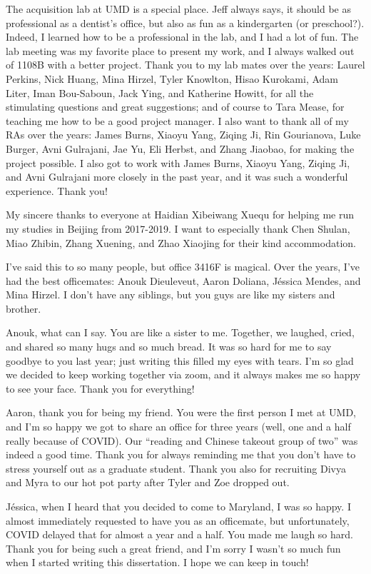 The acquisition lab at UMD is a special place. Jeff always says, it should be as professional as a dentist's office, but also as fun as a kindergarten (or preschool?). Indeed, I learned how to be a professional in the lab, and I had a lot of fun. The lab meeting was my favorite place to present my work, and I always walked out of 1108B with a better project. Thank you to my lab mates over the years: Laurel Perkins, Nick Huang, Mina Hirzel, Tyler Knowlton, Hisao Kurokami, Adam Liter, Iman Bou-Saboun, Jack Ying, and Katherine Howitt, for all the stimulating questions and great suggestions; and of course to Tara Mease, for teaching me how to be a good project manager. I also want to thank all of my RAs over the years: James Burns, Xiaoyu Yang, Ziqing Ji, Rin Gourianova, Luke Burger, Avni Gulrajani, Jae Yu, Eli Herbst, and Zhang Jiaobao, for making the project possible. I also got to work with James Burns, Xiaoyu Yang, Ziqing Ji, and Avni Gulrajani more closely in the past year, and it was such a wonderful experience. Thank you!
 
My sincere thanks to everyone at Haidian Xibeiwang Xuequ for helping me run my studies in Beijing from 2017-2019.  I want to especially thank Chen Shulan, Miao Zhibin, Zhang Xuening, and Zhao Xiaojing for their kind accommodation.
 
I’ve said this to so many people, but office 3416F is magical. Over the years, I’ve had the best officemates: Anouk Dieuleveut, Aaron Doliana, J\'essica Mendes, and Mina Hirzel. I don’t have any siblings, but you guys are like my sisters and brother.
 
Anouk, what can I say. You are like a sister to me. Together, we laughed, cried, and shared so many hugs and so much bread. It was so hard for me to say goodbye to you last year; just writing this filled my eyes with tears. I’m so glad we decided to keep working together via zoom, and it always makes me so happy to see your face. Thank you for everything!
 
Aaron, thank you for being my friend. You were the first person I met at UMD, and I’m so happy we got to share an office for three years (well, one and a half really because of COVID). Our “reading and Chinese takeout group of two” was indeed a good time. Thank you for always reminding me that you don’t have to stress yourself out as a graduate student. Thank you also for recruiting Divya and Myra to our hot pot party after Tyler and Zoe dropped out.

 
J\'essica, when I heard that you decided to come to Maryland, I was so happy. I almost immediately requested to have you as an officemate, but unfortunately, COVID delayed that for almost a year and a half. You made me laugh so hard. Thank you for being such a great friend, and I'm sorry I wasn’t so much fun when I started writing this dissertation. I hope we can keep in touch!
 
